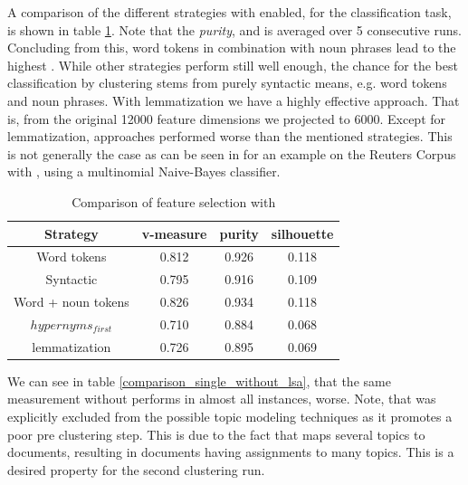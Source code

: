 A comparison of the different strategies with \lsa{} enabled, for the classification task, is shown in table \ref{comparison_single_with_lsa}. Note that the \emph{purity}, \vmeasure{} and \silco{} is averaged over 5 consecutive runs. Concluding from this, word tokens in combination with noun phrases lead to the highest \vmeasure{}. While other strategies perform still well enough, the chance for the best classification by clustering stems from purely syntactic means, e.g. word tokens and noun phrases. With \wordnet{} lemmatization we have a highly effective approach. That is, from the original 12000 feature dimensions we projected to 6000. Except for lemmatization, \wordnet{} approaches performed worse than the mentioned strategies. This is not generally the case as can be seen in \cite{TopicClassificationReuters2002} for an example on the Reuters Corpus with \wordnet{}, using a multinomial Naive-Bayes classifier.

  \begin{table}[h!]\label{comparison_single_with_lsa}
    \centering
    \begin{tabular}{ c | c | c | c }
      Strategy    & v-measure & purity  & silhouette \\ \hline
      Word tokens & 0.812     & 0.926   & 0.118      \\
      Syntactic   & 0.795     & 0.916     & 0.109 \\
      Word + noun tokens & 0.826   & 0.934     & 0.118 \\
      \wordnet{} $hypernyms_{first}$ & 0.710   & 0.884     & 0.068 \\
      \wordnet{} lemmatization   & 0.726   & 0.895     & 0.069 \\
    \end{tabular}
    \caption{Comparison of feature selection with \lsa{}}
  \end{table}

We can see in table \ref{comparison_single_without_lsa}, that the same measurement without \lsa{} performs in almost all instances, worse. Note, that \lda{} was explicitly excluded from the possible topic modeling techniques as it promotes a poor pre clustering step. This is due to the fact that \lda{} maps several topics to documents, resulting in documents having assignments to many topics. This is a desired property for the second clustering run.

